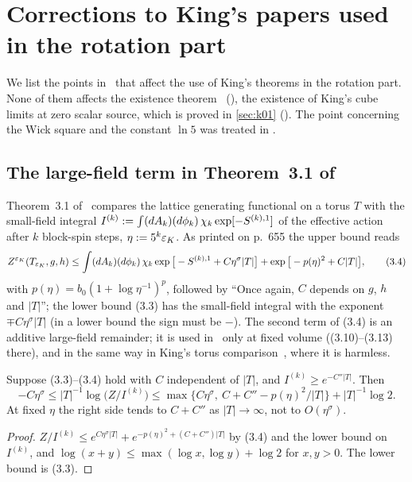 \section{Corrections to King's papers used in the rotation part}

We list the points in~\cite{K1,K2} that affect the use of King's theorems in the rotation part. None of them affects the existence theorem \EC\ (), the existence of King's cube limits at zero scalar source, which is proved in \cref{sec:k01} (). The point concerning the Wick square and the constant $\ln5$ was treated in .

\subsection{The large-field term in Theorem~3.1 of~\cite{K1}}

Theorem~3.1 of~\cite{K1} compares the lattice generating functional on a torus $T$ with the small-field integral
$I^{(k)}:=\int(dA_k)(d\phi_k)\,\chi_k\exp[-S^{(k),1}]$ of the effective action after $k$ block-spin steps, $\eta:=5^k\varepsilon_K$. As printed on p.~655 the upper bound reads
\[
Z^{\varepsilon_K}(T_{\varepsilon_K},g,h)\le\int(dA_k)(d\phi_k)\,\chi_k\exp\big[-S^{(k),1}+C\eta^\sigma|T|\big]+\exp\big[-p(\eta)^2+C|T|\big],\qquad(3.4)
\]
with $p(\eta)=b_0(1+\log\eta^{-1})^p$, followed by ``Once again, $C$ depends on $g$, $h$ and $|T|$''; the lower bound (3.3) has the small-field integral with the exponent $\mp C\eta^\sigma|T|$ (in a lower bound the sign must be $-$). The second term of (3.4) is an additive large-field remainder; it is used in~\cite{K1} only at fixed volume ((3.10)--(3.13) there), and in the same way in King's torus comparison~\cite[(4.7)]{K2}, where it is harmless.

\begin{proposition}\label{rot:prop:largefield}
Suppose (3.3)--(3.4) hold with $C$ independent of $|T|$, and $I^{(k)}\ge e^{-C''|T|}$. Then
\[
-C\eta^\sigma\le|T|^{-1}\log\big(Z/I^{(k)}\big)\le\max\{C\eta^\sigma,\ C+C''-p(\eta)^2/|T|\}+|T|^{-1}\log2 .
\]
At fixed $\eta$ the right side tends to $C+C''$ as $|T|\to\infty$, not to $O(\eta^\sigma)$.
\end{proposition}

\begin{proof}
$Z/I^{(k)}\le e^{C\eta^\sigma|T|}+e^{-p(\eta)^2+(C+C'')|T|}$ by (3.4) and the lower bound on $I^{(k)}$, and $\log(x+y)\le\max(\log x,\log y)+\log2$ for $x,y>0$. The lower bound is (3.3).
\end{proof}

